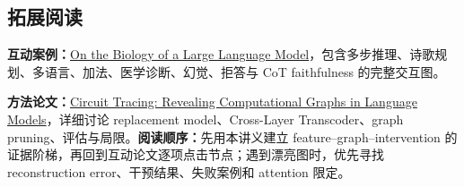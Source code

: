 \enlargethispage{4\baselineskip}
\subsection{拓展阅读}

\small
\noindent\textbf{互动案例：}\href{https://transformer-circuits.pub/2025/attribution-graphs/biology.html}{On the Biology of a Large Language Model}，包含多步推理、诗歌规划、多语言、加法、医学诊断、幻觉、拒答与 CoT faithfulness 的完整交互图。

\noindent\textbf{方法论文：}\href{https://transformer-circuits.pub/2025/attribution-graphs/methods.html}{Circuit Tracing: Revealing Computational Graphs in Language Models}，详细讨论 replacement model、Cross-Layer Transcoder、graph pruning、评估与局限。\textbf{阅读顺序：}先用本讲义建立 feature--graph--intervention 的证据阶梯，再回到互动论文逐项点击节点；遇到漂亮图时，优先寻找 reconstruction error、干预结果、失败案例和 attention 限定。
\normalsize


